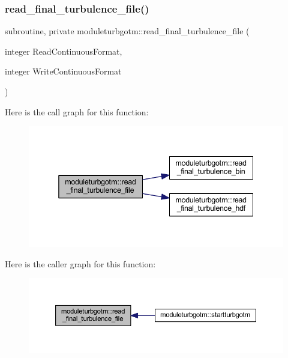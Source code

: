 \subsubsection{\texorpdfstring{read\+\_\+final\+\_\+turbulence\+\_\+file()}{read\_final\_turbulence\_file()}}
{\footnotesize\ttfamily subroutine, private moduleturbgotm\+::read\+\_\+final\+\_\+turbulence\+\_\+file (\begin{DoxyParamCaption}\item[{integer}]{Read\+Continuous\+Format,  }\item[{integer}]{Write\+Continuous\+Format }\end{DoxyParamCaption})\hspace{0.3cm}{\ttfamily [private]}}

Here is the call graph for this function\+:\nopagebreak
\begin{figure}[H]
\begin{center}
\leavevmode
\includegraphics[width=338pt]{namespacemoduleturbgotm_afb5ea6833bc3fb9e5ef6bc373e92a305_cgraph}
\end{center}
\end{figure}
Here is the caller graph for this function\+:\nopagebreak
\begin{figure}[H]
\begin{center}
\leavevmode
\includegraphics[width=350pt]{namespacemoduleturbgotm_afb5ea6833bc3fb9e5ef6bc373e92a305_icgraph}
\end{center}
\end{figure}
\mbox{\label{namespacemoduleturbgotm_a8389365bd5c5c531982068da1e23ce6f}} 

